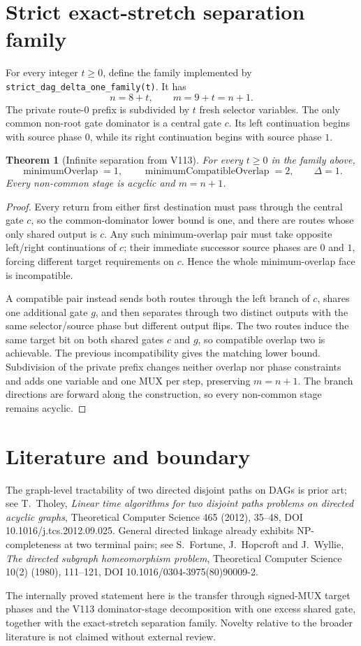 \documentclass[11pt]{article}
\newtheorem{theorem}{Theorem}
\begin{document}
\section{Strict exact-stretch separation family}
For every integer $t\geq0$, define the family implemented by \texttt{strict\_dag\_delta\_one\_family(t)}.  It has
\[
n=8+t,\qquad m=9+t=n+1.
\]
The private route-0 prefix is subdivided by $t$ fresh selector variables.  The only common non-root gate dominator is a central gate $c$.  Its left continuation begins with source phase $0$, while its right continuation begins with source phase $1$.

\begin{theorem}[Infinite separation from V113]
For every $t\geq0$ in the family above,
\[
\operatorname{minimumOverlap}=1,
\qquad
\operatorname{minimumCompatibleOverlap}=2,
\qquad
\Delta=1.
\]
Every non-common stage is acyclic and $m=n+1$.
\end{theorem}
\begin{proof}
Every return from either first destination must pass through the central gate $c$, so the common-dominator lower bound is one, and there are routes whose only shared output is $c$.  Any such minimum-overlap pair must take opposite left/right continuations of $c$; their immediate successor source phases are $0$ and $1$, forcing different target requirements on $c$.  Hence the whole minimum-overlap face is incompatible.

A compatible pair instead sends both routes through the left branch of $c$, shares one additional gate $g$, and then separates through two distinct outputs with the same selector/source phase but different output flips.  The two routes induce the same target bit on both shared gates $c$ and $g$, so compatible overlap two is achievable.  The previous incompatibility gives the matching lower bound.  Subdivision of the private prefix changes neither overlap nor phase constraints and adds one variable and one MUX per step, preserving $m=n+1$.  The branch directions are forward along the construction, so every non-common stage remains acyclic.
\end{proof}

\section{Literature and boundary}
The graph-level tractability of two directed disjoint paths on DAGs is prior art; see T.~Tholey, \emph{Linear time algorithms for two disjoint paths problems on directed acyclic graphs}, Theoretical Computer Science 465 (2012), 35--48, DOI 10.1016/j.tcs.2012.09.025.  General directed linkage already exhibits NP-completeness at two terminal pairs; see S.~Fortune, J.~Hopcroft and J.~Wyllie, \emph{The directed subgraph homeomorphism problem}, Theoretical Computer Science 10(2) (1980), 111--121, DOI 10.1016/0304-3975(80)90009-2.

The internally proved statement here is the transfer through signed-MUX target phases and the V113 dominator-stage decomposition with one excess shared gate, together with the exact-stretch separation family.  Novelty relative to the broader literature is not claimed without external review.
\end{document}
